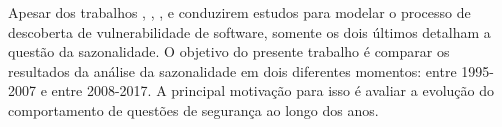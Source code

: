 Apesar dos trabalhos , , ,  e  conduzirem estudos para modelar o processo de descoberta de vulnerabilidade de software, somente os dois últimos detalham a questão da sazonalidade. O objetivo do presente trabalho é comparar os resultados da análise da sazonalidade em dois diferentes momentos: entre 1995-2007 e entre 2008-2017. A principal motivação para isso é avaliar a evolução do comportamento de questões de segurança ao longo dos anos.